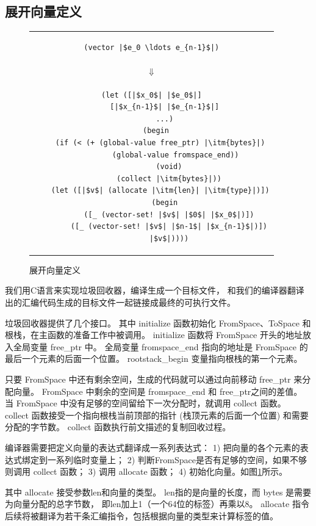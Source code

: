 \subsection{展开向量定义}


\begin{figure}[t]
\begin{center}
\vspace{0.4em}
\begin{tabular}{c}
\begin{lstlisting}
(vector |$e_0 \ldots e_{n-1}$|)
\end{lstlisting}
\\
$\Downarrow$
\\
\begin{lstlisting}
(let ([|$x_0$| |$e_0$|]
      [|$x_{n-1}$| |$e_{n-1}$|]
      ...)
  (begin
    (if (< (+ (global-value free_ptr) |\itm{bytes}|)
           (global-value fromspace_end))
        (void)
        (collect |\itm{bytes}|))
    (let ([|$v$| (allocate |\itm{len}| |\itm{type}|)])
      (begin
        ([_ (vector-set! |$v$| |$0$| |$x_0$|)])
        ([_ (vector-set! |$v$| |$n-1$| |$x_{n-1}$|)])
        |$v$|))))
\end{lstlisting}
\end{tabular}
\vspace{0.8em}
\end{center}

    \caption{展开向量定义}
    \label{fig:expose-vector}
\end{figure}

我们用C语言来实现垃圾回收器，编译生成一个目标文件，
和我们的编译器翻译出的汇编代码生成的目标文件一起链接成最终的可执行文件。

垃圾回收器提供了几个接口。
其中 initialize 函数初始化 FromSpace、ToSpace 和根栈，在主函数的准备工作中被调用。
initialize 函数将 FromSpace 开头的地址放入全局变量 free\_ptr 中。
全局变量 fromspace\_end 指向的地址是 FromSpace 的最后一个元素的后面一个位置。
rootstack\_begin 变量指向根栈的第一个元素。

只要 FromSpace 中还有剩余空间，生成的代码就可以通过向前移动 free\_ptr 来分配向量。
FromSpace 中剩余的空间是 fromspace\_end 和 free\_ptr之间的差值。
当 FromSpace 中没有足够的空间留给下一次分配时，就调用 collect 函数。
collect 函数接受一个指向根栈当前顶部的指针 (栈顶元素的后面一个位置) 和需要分配的字节数。
collect 函数执行前文描述的复制回收过程。

编译器需要把定义向量的表达式翻译成一系列表达式：
1) 把向量的各个元素的表达式绑定到一系列临时变量上；
2) 判断FromSpace是否有足够的空间，如果不够则调用 collect 函数；
3) 调用 allocate 函数；
4) 初始化向量。如图\ref{fig:expose-vector}所示。

其中 allocate 接受参数len和向量的类型。
len指的是向量的长度，而 bytes 是需要为向量分配的总字节数，
即len加上1（一个64位的标签）再乘以8。
allocate 指令后续将被翻译为若干条汇编指令，包括根据向量的类型来计算标签的值。
